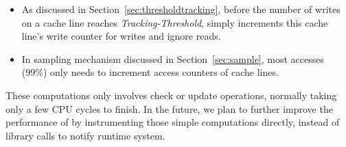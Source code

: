 \begin{itemize}
\item
As discussed in Section~\ref{sec:thresholdtracking}, 
before the number of writes on a cache line reaches {\it Tracking-Threshold}, 
\Predator{} simply increments this cache line's write counter for writes
and ignore reads.
\item
In sampling mechanism discussed in Section~\ref{sec:sample}, 
most accesses (99\%) only needs to increment access counters of cache lines.
\end{itemize}

These computations only involves check or update operations,
normally taking only a few CPU cycles to finish. 
In the future, we plan to further improve the performance of \Predator{} 
by instrumenting those simple computations directly, 
instead of library calls to notify runtime system.

